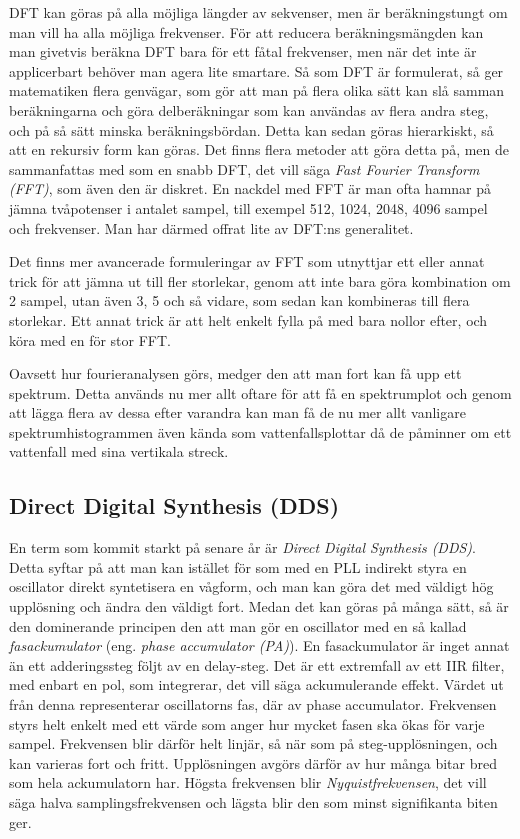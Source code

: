 DFT kan göras på alla möjliga längder av sekvenser, men är beräkningstungt
om man vill ha alla möjliga frekvenser.
För att reducera beräkningsmängden kan man givetvis beräkna DFT bara för ett
fåtal frekvenser, men när det inte är applicerbart behöver man agera lite
smartare.
Så som DFT är formulerat, så ger matematiken flera genvägar, som gör att man
på flera olika sätt kan slå samman beräkningarna och göra delberäkningar som
kan användas av flera andra steg, och på så sätt minska beräkningsbördan.
Detta kan sedan göras hierarkiskt, så att en rekursiv form kan göras.
Det finns flera metoder att göra detta på, men de sammanfattas med som en snabb
DFT, det vill säga \emph{Fast Fourier Transform (FFT)}, som även den är diskret.
En nackdel med FFT är man ofta hamnar på jämna tvåpotenser i antalet sampel,
till exempel 512, 1024, 2048, 4096 sampel och frekvenser.
Man har därmed offrat lite av DFT:ns generalitet.

Det finns mer avancerade formuleringar av FFT som utnyttjar ett eller annat
trick för att jämna ut till fler storlekar, genom att inte bara göra
kombination om 2 sampel, utan även 3, 5 och så vidare, som sedan kan kombineras
till flera storlekar.
Ett annat trick är att helt enkelt fylla på med bara nollor efter, och köra
med en för stor FFT.

Oavsett hur fourieranalysen görs, medger den att man fort kan få upp ett
spektrum.
Detta används nu mer allt oftare för att få en spektrumplot och genom att
lägga flera av dessa efter varandra kan man få de nu mer allt vanligare
spektrumhistogrammen även kända som vattenfallsplottar då de påminner om ett
vattenfall med sina vertikala streck.

\subsection{Direct Digital Synthesis (DDS)}

En term som kommit starkt på senare år är \emph{Direct Digital Synthesis (DDS)}.
Detta syftar på att man kan istället för som med en PLL indirekt styra en
oscillator direkt syntetisera en vågform, och man kan göra det med väldigt
hög upplösning och ändra den väldigt fort.
Medan det kan göras på många sätt, så är den dominerande principen den att
man gör en oscillator med en så kallad \emph{fasackumulator} (eng. \emph{phase
accumulator (PA)}).
En fasackumulator är inget annat än ett adderingssteg följt av en delay-steg.
Det är ett extremfall av ett IIR filter, med enbart en pol, som integrerar,
det vill säga ackumulerande effekt.
Värdet ut från denna representerar oscillatorns fas, där av phase accumulator.
Frekvensen styrs helt enkelt med ett värde som anger hur mycket fasen ska
ökas för varje sampel.
Frekvensen blir därför helt linjär, så när som på steg-upplösningen, och kan
varieras fort och fritt.
Upplösningen avgörs därför av hur många bitar bred som hela ackumulatorn har.
Högsta frekvensen blir \emph{Nyquistfrekvensen}, det vill säga halva
samplingsfrekvensen och lägsta blir den som minst signifikanta biten ger.

